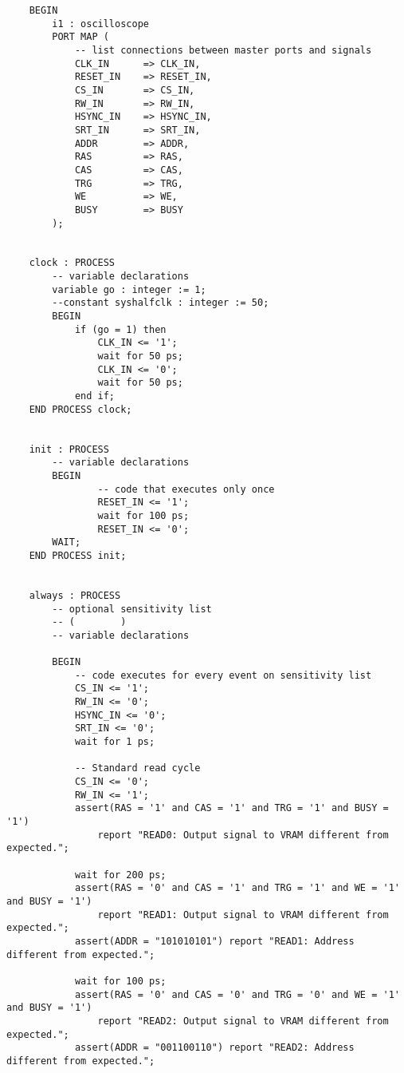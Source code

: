 \begin{lstlisting}
	BEGIN
		i1 : oscilloscope
		PORT MAP (
			-- list connections between master ports and signals
			CLK_IN 		=> CLK_IN,
			RESET_IN 	=> RESET_IN,
			CS_IN 		=> CS_IN,
			RW_IN 		=> RW_IN,
			HSYNC_IN 	=> HSYNC_IN,
			SRT_IN 		=> SRT_IN,
			ADDR 		=> ADDR,
			RAS 		=> RAS,
			CAS 		=> CAS,
			TRG 		=> TRG,
			WE 			=> WE,
			BUSY		=> BUSY
		);


	clock : PROCESS                                               
		-- variable declarations
		variable go : integer := 1;                                     
		--constant syshalfclk : integer := 50;
		BEGIN     
			if (go = 1) then
		    	CLK_IN <= '1';
		    	wait for 50 ps;
		    	CLK_IN <= '0';
		    	wait for 50 ps;
		    end if;
	END PROCESS clock; 


	init : PROCESS                                               
		-- variable declarations                                     
		BEGIN                                                        
		        -- code that executes only once
		        RESET_IN <= '1';
		        wait for 100 ps;
		        RESET_IN <= '0';
		WAIT;                                                       
	END PROCESS init;   


	always : PROCESS                                              
		-- optional sensitivity list                                  
		-- (        )                                                 
		-- variable declarations

		BEGIN                                                         
		    -- code executes for every event on sensitivity list  
		    CS_IN <= '1';
		    RW_IN <= '0';
		    HSYNC_IN <= '0';
		    SRT_IN <= '0';
		    wait for 1 ps;
		    
		    -- Standard read cycle
		    CS_IN <= '0';
		    RW_IN <= '1';
		    assert(RAS = '1' and CAS = '1' and TRG = '1' and BUSY = '1') 
		    	report "READ0: Output signal to VRAM different from expected.";

		    wait for 200 ps;
		    assert(RAS = '0' and CAS = '1' and TRG = '1' and WE = '1' and BUSY = '1') 
		    	report "READ1: Output signal to VRAM different from expected.";
		    assert(ADDR = "101010101") report "READ1: Address different from expected.";

		    wait for 100 ps;
		    assert(RAS = '0' and CAS = '0' and TRG = '0' and WE = '1' and BUSY = '1') 
		    	report "READ2: Output signal to VRAM different from expected.";
		    assert(ADDR = "001100110") report "READ2: Address different from expected.";


\end{lstlisting}
